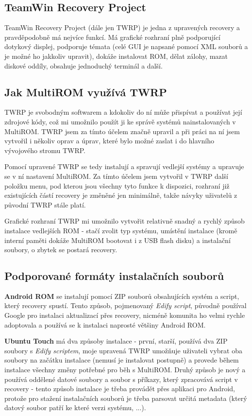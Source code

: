 \documentclass[12pt, a4paper, oneside]{article}
\newcommand{\B}{\textbf} %
\newcommand{\It}{\textit}  %
\begin{document}
\subsection{TeamWin Recovery Project}
TeamWin Recovery Project (dále jen TWRP) je jedna z upravených recovery a pravděpodobně má nejvíce funkcí. Má grafické rozhraní plně podporující dotykový displej, podporuje témata (celé GUI je napsané pomocí XML souborů a je možné ho jakkoliv upravit), dokáže instalovat ROM, dělat zálohy, mazat diskové oddíly, obsahuje jednoduchý terminál a další. 


\subsection{Jak MultiROM využívá TWRP}
TWRP je svobodným softwarem a kdokoliv do ní může přispívat a používat její zdrojové kódy, což mi umožnilo použít ji ke správě systémů nainstalovaných v MultiROM. TWRP jsem za tímto účelem značně upravil a při práci na ní jsem vytvořil i několiv oprav a úprav, které bylo možné zaslat i do hlavního vývojového stromu TWRP.

Pomocí upravené TWRP se tedy instalují a spravují vedlejší systémy a upravuje se v ní nastavení MultiROM. Za tímto účelem jsem vytvořil v TWRP další položku menu, pod kterou jsou všechny tyto funkce k dispozici, rozhraní již existujících částí recovery je změněné jen minimálně, takže návyky uživatelů z původní TWRP stále platí.

Grafické rozhraní TWRP mi umožnilo vytvořit relativně snadný a rychlý způsob instalace vedlejších ROM - stačí zvolit typ systému, umístění instalace (kromě interní paměti dokáže MultiROM bootovat i z USB flash disku) a instalační soubory, o zbytek se postará recovery.

\subsection {Podporované formáty instalačních souborů}
\B{Android ROM} se instalují pomocí ZIP souborů obsahujících systém a script, který recovery spustí. Tento způsob, pojmenovaný \It{Edify script}, původně používal Google pro instalaci aktualizací přes recovery, nicméně komunita ho velmi rychle adoptovala a používá se k instalaci naprosté většiny Android ROM.

\B{Ubuntu Touch} má dva způsoby instalace - první, starší, používá dva ZIP soubory s \It{Edify scriptem}, moje upravená TWRP umožňuje uživateli vybrat oba soubory na začátku instalace (nemusí je instalovat postupně) a provede během instalace všechny změny potřebné pro běh s MultiROM. Druhý způsob je nový a používá oddělené datové soubory a soubor s příkazy, který zpracovává script v recovery - tento způsob instalace je třeba provádět přes aplikaci pro Android, protože pro stažení instalačních souborů je třeba parsovat určitá metadata (který datový soubor patří ke které verzi systému, ...).
\end{document}
